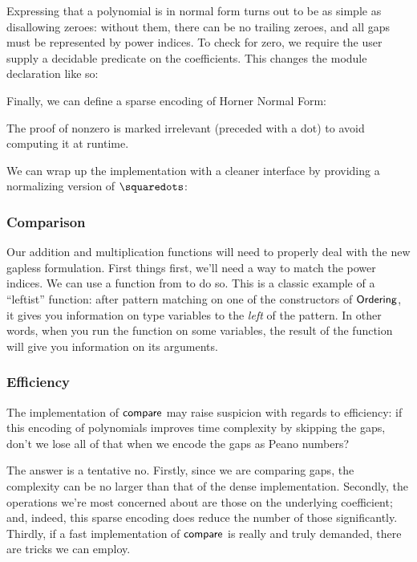 \documentclass[draft, twocolumn]{article}
\begin{document}
Expressing that a polynomial is in normal form turns out to be as simple as
disallowing zeroes: without them, there can be no trailing zeroes, and all gaps
must be represented by power indices. To check for zero, we require the user
supply a decidable predicate on the coefficients. This changes the module
declaration like so:

Finally, we can define a sparse encoding of Horner Normal Form:

The proof of nonzero is marked irrelevant (preceded with a dot) to avoid
computing it at runtime.

We can wrap up the implementation with a cleaner interface by providing a
normalizing version of \(\squaredots\):
\subsubsection{Comparison}
Our addition and multiplication functions will need to properly deal with the
new gapless formulation. First things first, we'll need a way to match the power
indices. We can use a function from\cite{mcbride_view_2004} to do so.
This is a classic example of a ``leftist'' function: after pattern matching on
one of the constructors of \(\AgdaDatatype{Ordering}\), it gives you information
on type variables to the \emph{left} of the pattern. In other words, when you
run the function on some variables, the result of the function will give you
information on its arguments.
\subsubsection{Efficiency}
The implementation of \(\AgdaFunction{compare}\) may raise suspicion with
regards to efficiency: if this encoding of polynomials improves time complexity
by skipping the gaps, don't we lose all of that when we encode the gaps as Peano
numbers?

The answer is a tentative no. Firstly, since we are comparing gaps, the
complexity can be no larger than that of the dense implementation. Secondly, the
operations we're most concerned about are those on the underlying coefficient;
and, indeed, this sparse encoding does reduce the number of those significantly.
Thirdly, if a fast implementation of \(\AgdaFunction{compare}\) is really and
truly demanded, there are tricks we can employ.
\end{document}
